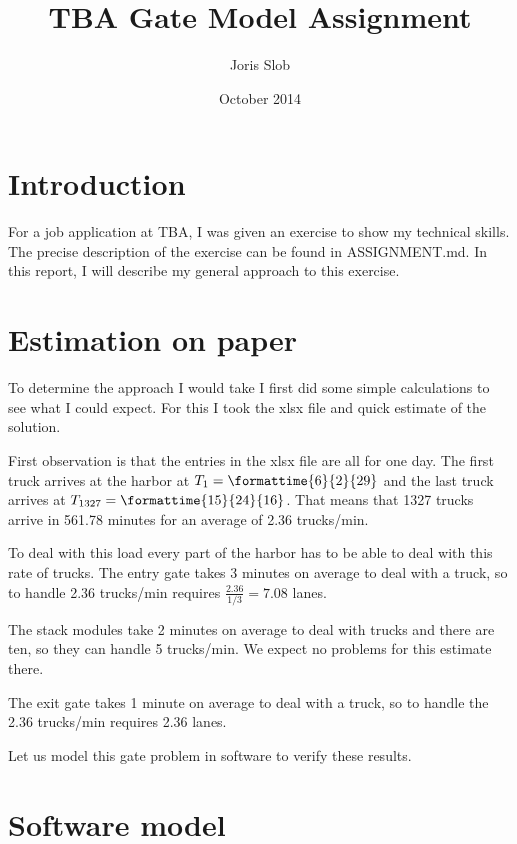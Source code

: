 \documentclass{article}
\begin{document}
\title{TBA Gate Model Assignment}
\author{Joris Slob}
\date{October 2014}
\maketitle

\section{Introduction}

For a job application at TBA, I was given an exercise to show my
technical skills. The precise description of the exercise can be found
in ASSIGNMENT.md. In this report, I will describe my general approach
to this exercise.

\section{Estimation on paper}

To determine the approach I would take I first did some simple
calculations to see what I could expect. For this I took the xlsx file
and quick estimate of the solution.

First observation is that the entries in the xlsx file are all for one
day. The first truck arrives at the harbor at $T_1 =
\mbox{\formattime{6}{2}{29}}$ and the last truck arrives at $T_{1327}
= \mbox{\formattime{15}{24}{16}}$. That means that 1327 trucks arrive
in 561.78 minutes for an average of 2.36 trucks/min.

To deal with this load every part of the harbor has to be able to deal
with this rate of trucks. The entry gate takes 3 minutes on average to
deal with a truck, so to handle 2.36 trucks/min requires
$\frac{2.36}{1/3} = 7.08$ lanes.

The stack modules take 2 minutes on average to deal with trucks and
there are ten, so they can handle 5 trucks/min. We expect no problems
for this estimate there.

The exit gate takes 1 minute on average to deal with a truck, so to
handle the 2.36 trucks/min requires 2.36 lanes.

Let us model this gate problem in software to verify these results.

\section{Software model}
\end{document}
